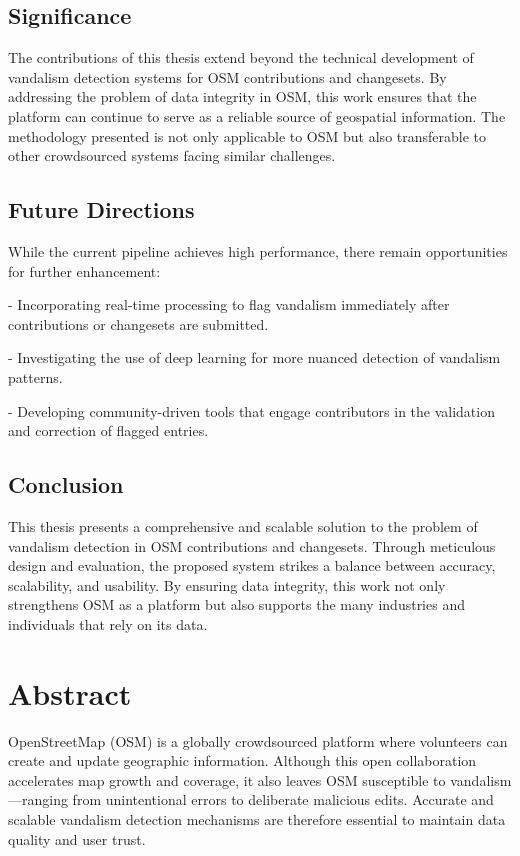 \documentclass[
    13pt, %
    a4paper, %
    twoside, 
    DIV14, %
    listof=totoc, %
    bibliography=totoc, %
    index=totoc, %
    headsepline
]{scrreprt}
\begin{document}
\subsection*{Significance}

The contributions of this thesis extend beyond the technical development of vandalism detection systems for OSM contributions and changesets. By addressing the problem of data integrity in OSM, this work ensures that the platform can continue to serve as a reliable source of geospatial information. The methodology presented is not only applicable to OSM but also transferable to other crowdsourced systems facing similar challenges.

\subsection*{Future Directions}

While the current pipeline achieves high performance, there remain opportunities for further enhancement:

\noindent- Incorporating real-time processing to flag vandalism immediately after contributions or changesets are submitted.

\noindent- Investigating the use of deep learning for more nuanced detection of vandalism patterns.

\noindent- Developing community-driven tools that engage contributors in the validation and correction of flagged entries.

\subsection*{Conclusion}

This thesis presents a comprehensive and scalable solution to the problem of vandalism detection in OSM contributions and changesets. Through meticulous design and evaluation, the proposed system strikes a balance between accuracy, scalability, and usability. By ensuring data integrity, this work not only strengthens OSM as a platform but also supports the many industries and individuals that rely on its data.


\newpage
\section*{\LARGE Abstract}

OpenStreetMap (OSM) is a globally crowdsourced platform where volunteers can create and update geographic information. Although this open collaboration accelerates map growth and coverage, it also leaves OSM susceptible to vandalism—ranging from unintentional errors to deliberate malicious edits. Accurate and scalable vandalism detection mechanisms are therefore essential to maintain data quality and user trust.
\end{document}
